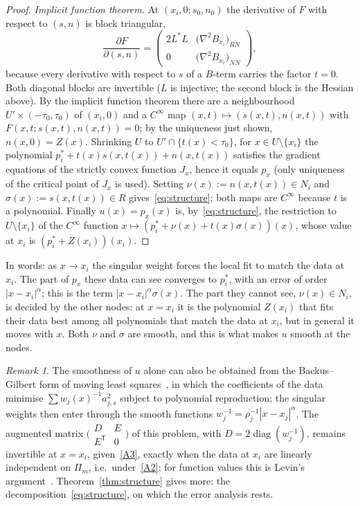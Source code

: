\documentclass[12pt]{amsart}
\theoremstyle{definition}
\theoremstyle{remark}
\newtheorem{remark}[theorem]{Remark}
\newcommand{\Pm}{\Pi_m}
\begin{document}
\begin{proof}
\emph{Implicit function theorem.} At $(x_i,0;s_0,n_0)$ the derivative of $F$ with respect to
$(s,n)$ is block triangular,
\[
  \frac{\partial F}{\partial(s,n)}=
  \begin{pmatrix} 2L^*L & \bigl(\nabla^2B_{x_i}\bigr)_{RN}\\[2pt] 0 & \bigl(\nabla^2B_{x_i}\bigr)_{NN}\end{pmatrix},
\]
because every derivative with respect to $s$ of a $B$-term carries the factor $t=0$. Both
diagonal blocks are invertible ($L$ is injective; the second block is the Hessian above).
By the implicit function theorem there are a neighbourhood $U'\times(-\tau_0,\tau_0)$ of
$(x_i,0)$ and a $C^\infty$ map $(x,t)\mapsto(s(x,t),n(x,t))$ with $F(x,t;s(x,t),n(x,t))=0$;
by the uniqueness just shown, $n(x,0)=Z(x)$. Shrinking $U$ to $U'\cap\{t(x)<\tau_0\}$, for
$x\in U\setminus\{x_i\}$ the polynomial $p_i^*+t(x)s(x,t(x))+n(x,t(x))$ satisfies the gradient
equations of the strictly convex function $J_x$, hence it equals $p_x$ (only uniqueness of the
critical point of $J_x$ is used). Setting $\nu(x):=n(x,t(x))\in N_i$ and
$\sigma(x):=s(x,t(x))\in R$ gives~\eqref{eq:structure}; both maps are $C^\infty$ because $t$ is
a polynomial. Finally $u(x)=p_x(x)$ is, by~\eqref{eq:structure}, the restriction to
$U\setminus\{x_i\}$ of the $C^\infty$ function $x\mapsto(p_i^*+\nu(x)+t(x)\sigma(x))(x)$, whose
value at $x_i$ is $(p_i^*+Z(x_i))(x_i)$.
\end{proof}

In words: as $x\to x_i$ the singular weight forces the local fit to match the data at $x_i$.
The part of $p_x$ these data can see converges to $p_i^*$, with an error of order
$|x-x_i|^\alpha$; this is the term $|x-x_i|^\alpha\sigma(x)$. The part they cannot see,
$\nu(x)\in N_i$, is decided by the other nodes: at $x=x_i$ it is the polynomial $Z(x_i)$ that fits
their data best among all polynomials that match the data at $x_i$, but in general it moves
with $x$. Both $\nu$ and $\sigma$ are smooth, and this is what makes $u$ smooth at the nodes.

\begin{remark}\label{rem:bg}
The smoothness of $u$ alone can also be obtained from the Backus--Gilbert form of moving least
squares~\cite[Proposition~1]{Levin1998}, in which the coefficients of the data minimise
$\sum w_{j}(x)^{-1}a_{j,s}^2$ subject to polynomial reproduction; the singular weights then enter
through the smooth functions $w_j^{-1}=\rho_j^{-1}|x-x_j|^\alpha$. The augmented matrix
$\bigl(\begin{smallmatrix}D&E\\E^{\mathsf T}&0\end{smallmatrix}\bigr)$ of this problem, with
$D=2\operatorname{diag}(w_j^{-1})$, remains invertible at $x=x_i$, given~\ref{A3}, exactly when the data at
$x_i$ are linearly independent on $\Pm$, i.e.\ under~\ref{A2}; for function values this is Levin's
argument~\cite[Proposition~2 and Theorem~3]{Levin1998}. Theorem~\ref{thm:structure} gives
more: the decomposition~\eqref{eq:structure}, on which the error analysis rests.
\end{remark}
\end{document}
